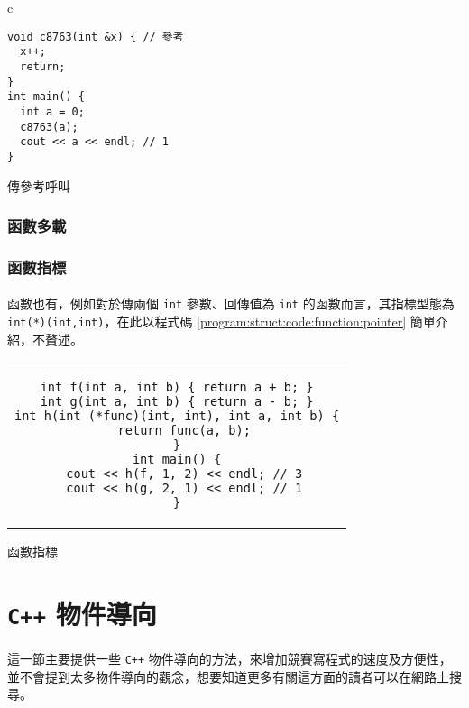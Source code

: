 \documentclass[12pt,a4paper,oneside]{report}
\begin{document}
\begin{CJK}{UTF8}{bkai}
\begin{code}[h!]
\centering
\begin{tabular}{c}
\begin{lstlisting}
void c8763(int &x) { // 參考
  x++;
  return;
}
int main() {
  int a = 0;
  c8763(a);
  cout << a << endl; // 1
}
\end{lstlisting}
\end{tabular}
\caption{傳參考呼叫}
\label{program:struct:code:function:pass:reference}
\end{code}

\subsubsection{函數多載}

\subsubsection{函數指標}

\paragraph{}函數也有，例如對於傳兩個 \lstinline!int! 參數、回傳值為 \lstinline!int! 的函數而言，其指標型態為 \lstinline!int(*)(int,int)!，在此以程式碼 \ref{program:struct:code:function:pointer} 簡單介紹，不贅述。

\begin{code}[h!]
\centering
\begin{tabular}{c}
\begin{lstlisting}
int f(int a, int b) { return a + b; }
int g(int a, int b) { return a - b; }
int h(int (*func)(int, int), int a, int b) {
  return func(a, b);
}
int main() {
  cout << h(f, 1, 2) << endl; // 3
  cout << h(g, 2, 1) << endl; // 1
}
\end{lstlisting}
\end{tabular}
\caption{函數指標}
\label{program:struct:code:function:pointer}
\end{code}

\section{\texttt{C++} 物件導向}

\paragraph{}這一節主要提供一些 \texttt{C++} 物件導向的方法，來增加競賽寫程式的速度及方便性，並不會提到太多物件導向的觀念，想要知道更多有關這方面的讀者可以在網路上搜尋。


\end{CJK}
\end{document}
